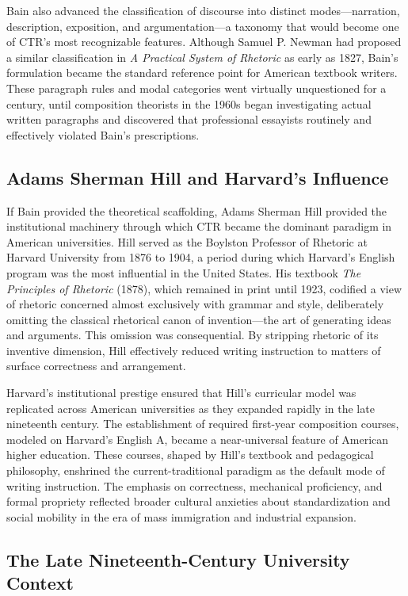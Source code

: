 \documentclass[12pt]{article}
\begin{document}
Bain also advanced the classification of discourse into distinct modes---narration, description, exposition, and argumentation---a taxonomy that would become one of CTR's most recognizable features. Although Samuel P. Newman had proposed a similar classification in \textit{A Practical System of Rhetoric} as early as 1827, Bain's formulation became the standard reference point for American textbook writers. These paragraph rules and modal categories went virtually unquestioned for a century, until composition theorists in the 1960s began investigating actual written paragraphs and discovered that professional essayists routinely and effectively violated Bain's prescriptions.

\subsection{Adams Sherman Hill and Harvard's Influence}

If Bain provided the theoretical scaffolding, Adams Sherman Hill provided the institutional machinery through which CTR became the dominant paradigm in American universities. Hill served as the Boylston Professor of Rhetoric at Harvard University from 1876 to 1904, a period during which Harvard's English program was the most influential in the United States. His textbook \textit{The Principles of Rhetoric} (1878), which remained in print until 1923, codified a view of rhetoric concerned almost exclusively with grammar and style, deliberately omitting the classical rhetorical canon of invention---the art of generating ideas and arguments. This omission was consequential. By stripping rhetoric of its inventive dimension, Hill effectively reduced writing instruction to matters of surface correctness and arrangement.

Harvard's institutional prestige ensured that Hill's curricular model was replicated across American universities as they expanded rapidly in the late nineteenth century. The establishment of required first-year composition courses, modeled on Harvard's English A, became a near-universal feature of American higher education. These courses, shaped by Hill's textbook and pedagogical philosophy, enshrined the current-traditional paradigm as the default mode of writing instruction. The emphasis on correctness, mechanical proficiency, and formal propriety reflected broader cultural anxieties about standardization and social mobility in the era of mass immigration and industrial expansion.

\subsection{The Late Nineteenth-Century University Context}
\end{document}
